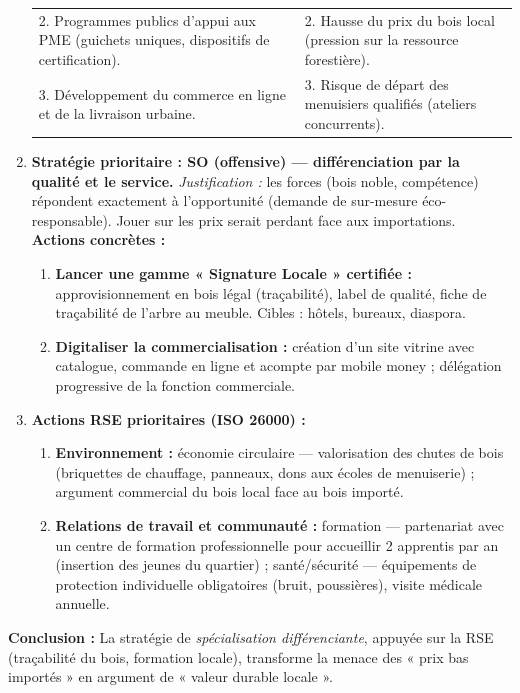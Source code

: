 \documentclass[11pt]{article}
\newcommand{\cle}[1]{{\popxbold\color{popdark}#1}}
\begin{document}
\begin{exoresolu}
\begin{enumerate}
\begin{center}
\begin{tabularx}{\linewidth}{|X|X|}
              2. Programmes publics d'appui aux PME (guichets uniques, dispositifs de certification). & 2. Hausse du prix du bois local (pression sur la ressource forestière). \\
              3. Développement du commerce en ligne et de la livraison urbaine. & 3. Risque de départ des menuisiers qualifiés (ateliers concurrents). \\ \hline
              \end{tabularx}
              \end{center}
        \item \textbf{Stratégie prioritaire : \cle{SO (offensive) — différenciation par la qualité et le service.}}
              \emph{Justification :} les forces (bois noble, compétence) répondent exactement à l'opportunité (demande de sur-mesure éco-responsable). Jouer sur les prix serait perdant face aux importations.
              \textbf{Actions concrètes :}
              \begin{enumerate}
                  \item \textbf{Lancer une gamme « Signature Locale » certifiée :} approvisionnement en bois légal (traçabilité), label de qualité, fiche de traçabilité de l'arbre au meuble. Cibles : hôtels, bureaux, diaspora.
                  \item \textbf{Digitaliser la commercialisation :} création d'un site vitrine avec catalogue, commande en ligne et acompte par mobile money ; délégation progressive de la fonction commerciale.
              \end{enumerate}
        \item \textbf{Actions RSE prioritaires (ISO 26000) :}
              \begin{enumerate}
                  \item \textbf{Environnement :} \cle{économie circulaire} — valorisation des chutes de bois (briquettes de chauffage, panneaux, dons aux écoles de menuiserie) ; argument commercial du bois local face au bois importé.
                  \item \textbf{Relations de travail et communauté :} \cle{formation} — partenariat avec un centre de formation professionnelle pour accueillir 2 apprentis par an (insertion des jeunes du quartier) ; \cle{santé/sécurité} — équipements de protection individuelle obligatoires (bruit, poussières), visite médicale annuelle.
              \end{enumerate}
    \end{enumerate}
    \textbf{Conclusion :} La stratégie de \emph{spécialisation différenciante}, appuyée sur la RSE (traçabilité du bois, formation locale), transforme la menace des « prix bas importés » en argument de « valeur durable locale ».
\end{exoresolu}
\end{document}
